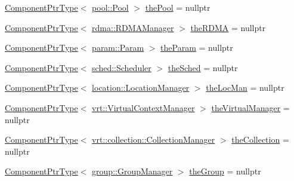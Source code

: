\begin{DoxyCompactItemize}
\hyperlink{structvt_1_1runtime_1_1_runtime_a0893bf0a8c03b898e8ab66b52cec80ad}{Component\+Ptr\+Type}$<$ \hyperlink{structvt_1_1pool_1_1_pool}{pool\+::\+Pool} $>$ \hyperlink{structvt_1_1runtime_1_1_runtime_a060aca8399f1c6499c4676a26db2e39e}{the\+Pool} = nullptr
\item 
\hyperlink{structvt_1_1runtime_1_1_runtime_a0893bf0a8c03b898e8ab66b52cec80ad}{Component\+Ptr\+Type}$<$ \hyperlink{structvt_1_1rdma_1_1_r_d_m_a_manager}{rdma\+::\+R\+D\+M\+A\+Manager} $>$ \hyperlink{structvt_1_1runtime_1_1_runtime_ab8ec604b336a974682b0fec124a4a31b}{the\+R\+D\+MA} = nullptr
\item 
\hyperlink{structvt_1_1runtime_1_1_runtime_a0893bf0a8c03b898e8ab66b52cec80ad}{Component\+Ptr\+Type}$<$ \hyperlink{structvt_1_1param_1_1_param}{param\+::\+Param} $>$ \hyperlink{structvt_1_1runtime_1_1_runtime_a3001881d47dc04ed4e77a1e183dd970e}{the\+Param} = nullptr
\item 
\hyperlink{structvt_1_1runtime_1_1_runtime_a0893bf0a8c03b898e8ab66b52cec80ad}{Component\+Ptr\+Type}$<$ \hyperlink{structvt_1_1sched_1_1_scheduler}{sched\+::\+Scheduler} $>$ \hyperlink{structvt_1_1runtime_1_1_runtime_ae9d0dc11ee40a455a64982eec66e3a26}{the\+Sched} = nullptr
\item 
\hyperlink{structvt_1_1runtime_1_1_runtime_a0893bf0a8c03b898e8ab66b52cec80ad}{Component\+Ptr\+Type}$<$ \hyperlink{structvt_1_1location_1_1_location_manager}{location\+::\+Location\+Manager} $>$ \hyperlink{structvt_1_1runtime_1_1_runtime_ae198134b20e8c3787f16f4e790f95d9a}{the\+Loc\+Man} = nullptr
\item 
\hyperlink{structvt_1_1runtime_1_1_runtime_a0893bf0a8c03b898e8ab66b52cec80ad}{Component\+Ptr\+Type}$<$ \hyperlink{structvt_1_1vrt_1_1_virtual_context_manager}{vrt\+::\+Virtual\+Context\+Manager} $>$ \hyperlink{structvt_1_1runtime_1_1_runtime_a85a0606ac06cd173561952676f09c077}{the\+Virtual\+Manager} = nullptr
\item 
\hyperlink{structvt_1_1runtime_1_1_runtime_a0893bf0a8c03b898e8ab66b52cec80ad}{Component\+Ptr\+Type}$<$ \hyperlink{structvt_1_1vrt_1_1collection_1_1_collection_manager}{vrt\+::collection\+::\+Collection\+Manager} $>$ \hyperlink{structvt_1_1runtime_1_1_runtime_a9c74bf08aceff27fa43330d3f1c8d581}{the\+Collection} = nullptr
\item 
\hyperlink{structvt_1_1runtime_1_1_runtime_a0893bf0a8c03b898e8ab66b52cec80ad}{Component\+Ptr\+Type}$<$ \hyperlink{structvt_1_1group_1_1_group_manager}{group\+::\+Group\+Manager} $>$ \hyperlink{structvt_1_1runtime_1_1_runtime_a0c446440cc8a67118f2ffd9de9f01be4}{the\+Group} = nullptr

\end{DoxyCompactItemize}
